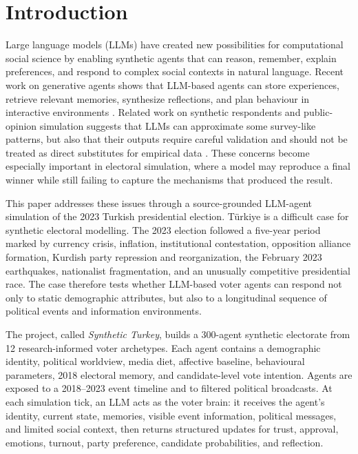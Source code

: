 \documentclass[pdflatex,sn-mathphys-num,iicol]{sn-jnl}
\begin{document}

\maketitle



\section{Introduction}\label{sec:introduction}

Large language models (LLMs) have created new possibilities for computational social science by enabling synthetic agents that can reason, remember, explain preferences, and respond to complex social contexts in natural language. Recent work on generative agents shows that LLM-based agents can store experiences, retrieve relevant memories, synthesize reflections, and plan behaviour in interactive environments \cite{park2023generative}. Related work on synthetic respondents and public-opinion simulation suggests that LLMs can approximate some survey-like patterns, but also that their outputs require careful validation and should not be treated as direct substitutes for empirical data \cite{argyle2023out,aher2023simulating,qu2024performance}. These concerns become especially important in electoral simulation, where a model may reproduce a final winner while still failing to capture the mechanisms that produced the result.

This paper addresses these issues through a source-grounded LLM-agent simulation of the 2023 Turkish presidential election. Türkiye is a difficult case for synthetic electoral modelling. The 2023 election followed a five-year period marked by currency crisis, inflation, institutional contestation, opposition alliance formation, Kurdish party repression and reorganization, the February 2023 earthquakes, nationalist fragmentation, and an unusually competitive presidential race. The case therefore tests whether LLM-based voter agents can respond not only to static demographic attributes, but also to a longitudinal sequence of political events and information environments.

The project, called \textit{Synthetic Turkey}, builds a 300-agent synthetic electorate from 12 research-informed voter archetypes. Each agent contains a demographic identity, political worldview, media diet, affective baseline, behavioural parameters, 2018 electoral memory, and candidate-level vote intention. Agents are exposed to a 2018--2023 event timeline and to filtered political broadcasts. At each simulation tick, an LLM acts as the voter brain: it receives the agent's identity, current state, memories, visible event information, political messages, and limited social context, then returns structured updates for trust, approval, emotions, turnout, party preference, candidate probabilities, and reflection.
\end{document}

